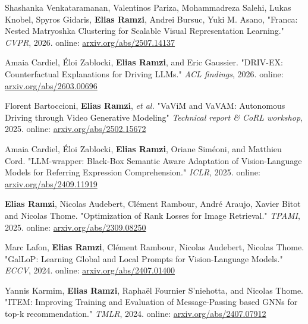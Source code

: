 \documentclass[11pt,a4paper,roman]{moderncv}
\begin{document}
{{{ \medbreak

Shashanka Venkataramanan, Valentinos Pariza, Mohammadreza Salehi, Lukas Knobel, Spyros Gidaris, \textbf{Elias Ramzi}, Andrei Bursuc, Yuki M. Asano, "Franca: Nested Matryoshka Clustering for Scalable Visual Representation Learning." \textit{CVPR}, 2026. online: \href{https://arxiv.org/abs/2507.14137}{arxiv.org/abs/2507.14137}

 \medbreak

 Amaia Cardiel, {\'E}loi Zablocki, \textbf{Elias Ramzi}, and Eric Gaussier. "DRIV-EX: Counterfactual Explanations for Driving LLMs." \textit{ACL findings}, 2026. online: \href{https://arxiv.org/abs/2603.00696}{arxiv.org/abs/2603.00696}

  \medbreak

 Florent Bartoccioni, \textbf{Elias Ramzi}, \textit{et al.} "VaViM and VaVAM: Autonomous Driving through Video Generative Modeling" \textit{Technical report \& CoRL workshop}, 2025. online: \href{https://arxiv.org/abs/2502.15672}{arxiv.org/abs/2502.15672}

\medbreak

Amaia Cardiel, {\'E}loi Zablocki, \textbf{Elias Ramzi}, Oriane Sim{\'e}oni, and Matthieu Cord. "LLM-wrapper: Black-Box Semantic Aware Adaptation of Vision-Language Models for Referring Expression Comprehension." \textit{ICLR}, 2025. online: \href{https://arxiv.org/abs/2409.11919}{arxiv.org/abs/2409.11919}

  \medbreak

     \textbf{Elias Ramzi}, Nicolas Audebert, Cl{\'e}ment Rambour, Andr{\'e} Araujo, Xavier Bitot and Nicolas Thome. "Optimization of Rank Losses for Image Retrieval." \textit{TPAMI}, 2025. online: \href{https://arxiv.org/abs/2309.08250}{arxiv.org/abs/2309.08250}

\medbreak

 Marc Lafon, \textbf{Elias Ramzi}, Cl{\'e}ment Rambour, Nicolas Audebert, Nicolas Thome. "GalLoP: Learning Global and Local Prompts for Vision-Language Models." \textit{ECCV}, 2024. online: \href{https://arxiv.org/abs/2407.01400}{arxiv.org/abs/2407.01400}

 \medbreak

Yannis Karmim, \textbf{Elias Ramzi}, Raphaël Fournier S’niehotta, and Nicolas Thome. "ITEM: Improving Training and Evaluation of Message-Passing based GNNs for top-k recommendation." \textit{TMLR}, 2024. online: \href{https://arxiv.org/abs/2407.07912}{arxiv.org/abs/2407.07912}

 \medbreak

}}}
\end{document}
